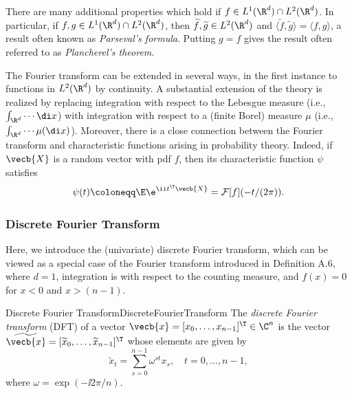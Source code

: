 There are many additional properties which hold if $f \in L^1(\R^d) \cap L^2(\R^d)$. In particular, if $f, g \in L^1(\R^d) \cap L^2(\R^d)$, then $\widetilde{f}, \widetilde{g} \in L^2(\R^d)$ and $\langle \widetilde{f}, \widetilde{g} \rangle = \langle f, g \rangle$, a result often known as \textit{Parseval's formula}. Putting $g=f$ gives the result often referred to as \textit{Plancherel's theorem}.

The Fourier transform can be extended in several ways, in the first instance to functions in $L^2(\R^d)$ by continuity. A substantial extension of the theory is realized by replacing integration with respect to the Lebesgue measure (i.e., $\int_{\R^d} \cdots \di x$) with integration with respect to a (finite Borel) measure $\mu$ (i.e., $\int_{\R^d} \cdots \mu(\di x)$). Moreover, there is a close connection between the Fourier transform and characteristic functions arising in probability theory. Indeed, if $\vecb{X}$ is a random vector with pdf $f$, then its characteristic function $\psi$ satisfies
\begin{equation*}
	\psi(t) \coloneqq \E \e^{\ii t^\T \vecb{X}} = \mathcal{F}[f](-t/(2\pi)).
\end{equation*}

\subsubsection{Discrete Fourier Transform}
Here, we introduce the (univariate) discrete Fourier transform, which can be viewed as a special case of the Fourier transform introduced in Definition A.6, where $d=1$, integration is with respect to the counting measure, and $f(x) = 0$ for $x < 0$ and $x > (n-1)$.

\begin{defn}{Discrete Fourier Transform}{DiscreteFourierTransform}
	The \textit{discrete Fourier transform} (DFT) of a vector $\vecb{x} = [x_0, \dots, x_{n-1}]^\T \in \C^n$ is the vector $\widetilde{\vecb{x}} = [\widetilde{x}_0, \dots, \widetilde{x}_{n-1}]^\T$ whose elements are given by
	\begin{equation}
		\widetilde{x}_t = \sum_{s=0}^{n-1} \omega^{st} x_s, \quad t = 0, \dots, n-1, \label{eq:DFTDefinition}
	\end{equation}
	where $\omega = \exp(-\ii 2\pi/n)$.
\end{defn}

